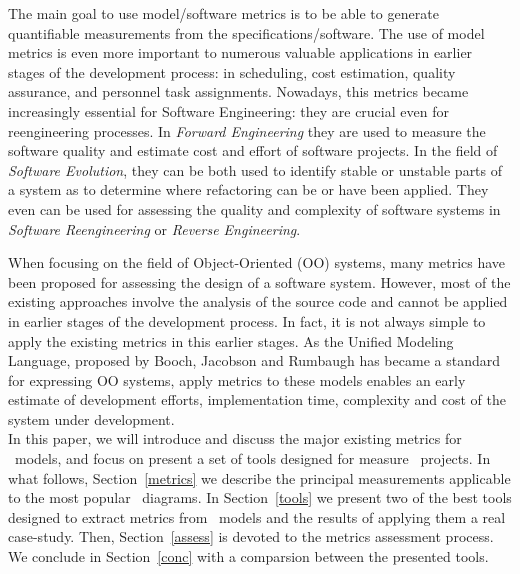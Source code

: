 The main goal to use model/software metrics is to be able to generate quantifiable measurements from the specifications/software. The use of model metrics is even more
important to numerous valuable applications in earlier stages of the development process: in scheduling, cost estimation, quality assurance, and personnel task assignments.
Nowadays, this metrics became increasingly essential for Software Engineering: they are crucial even for reengineering processes.
In \emph{Forward Engineering} they are used to measure the software quality and estimate cost and effort of software projects\cite{Fenton}.
In the field of \emph{Software Evolution}, they can be both used to identify stable or unstable parts of a system as to determine where refactoring can be or have been applied\cite{Serge}.
They even can be used for assessing the quality and complexity of software systems in \emph{Software Reengineering} or \emph{Reverse Engineering}\cite{43044}.

When focusing on the field of Object-Oriented (OO) systems, many metrics have been proposed for assessing the design of a software system.
However, most of the existing approaches involve the analysis of the source code and cannot be applied in earlier stages of the development process.
In fact, it is not always simple to apply the existing metrics in this earlier stages. 
As the \textsf{Unified Modeling Language}, proposed by Booch, Jacobson and Rumbaugh\cite{USDPuml} has became a standard for expressing OO systems, apply metrics to these models enables an early estimate of development efforts, implementation time, complexity and cost of the system under development. \\

In this paper, we will introduce and discuss the major existing metrics for \umlS~models, and focus on present a set of tools designed for measure \umlS~projects.
In what follows, Section~\ref{metrics} we describe the principal measurements applicable to the most popular \umlS~diagrams.
In Section~\ref{tools} we present two of the best tools designed to extract metrics from \umlS~models and the results of applying them a real case-study.
Then, Section~\ref{assess} is devoted to the metrics assessment process.
We conclude in Section~\ref{conc} with a comparsion between the presented tools.

